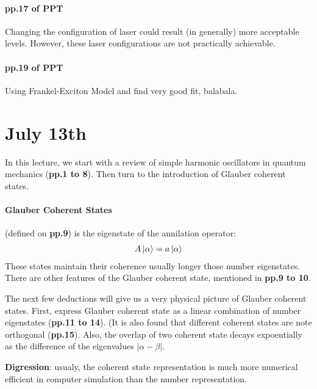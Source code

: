 \documentclass{article}
\numberwithin{equation}{subsection} %
\theoremstyle{definition}
\begin{document}
\paragraph{pp.17 of PPT}
Changing the configuration of laser could result (in generally) more
acceptable levels. However, these laser configurations are not practically
achievable.

\paragraph{pp.19 of PPT}
Using Frankel-Exciton Model and find very good fit, balabala.


\section{July 13th}
\label{sec:July_13th}

In this lecture, we start with a review of simple harmonic
oscillators in quantum mechanics (\textbf{pp.1 to 8}).
Then turn to the introduction of Glauber coherent states.

\paragraph{Glauber Coherent States} (defined on \textbf{pp.9})
is the eigenstate of the annilation 
operator:
    \begin{align}
        A \ket{\alpha} = a \ket{\alpha}
    \end{align}
These states maintain their coherence usually longer those number
eigenstates. There are other features of the Glauber coherent state,
mentioned in \textbf{pp.9 to 10}.

The next few deductions will give us a very physical picture of Glauber
coherent states. First, express Glauber coherent state as a linear
combination of number eigenstates (\textbf{pp.11 to 14}). 
(It is also found that different coherent states are note 
orthogonal (\textbf{pp.15}). Also, the overlap of
two coherent state decays expoentially as the difference 
of the eigenvalues $|\alpha-\beta|$.

\textbf{Digression}: usualy, the coherent state representation is
much more numerical efficient in computer simulation
than the number representation.
\end{document}
